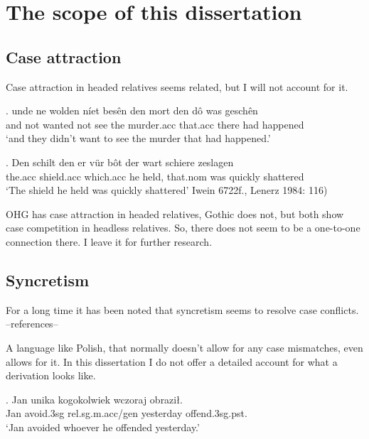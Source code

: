 \section{The scope of this dissertation}

\subsection{Case attraction}\label{sec:attraction}

Case attraction in headed relatives seems related, but I will not account for it.

\exg. unde ne wolden níet besên den mort den dô was geschên\\
 and not wanted not see the murder.\ac{acc} that.\ac{acc} there had happened\\
 `and they didn't want to see the murder that had happened.' 

 \exg. Den schilt den er {vür bôt} der wart schiere zeslagen\\
 the.\ac{acc} shield.\ac{acc} which.\ac{acc} he held, that.\ac{nom} was quickly shattered\\
 `The shield he held was quickly shattered' \label{ex:iaheaded}\hfill Iwein 6722f., Lenerz 1984: 116)

OHG has case attraction in headed relatives, Gothic does not, but both show case competition in headless relatives. So, there does not seem to be a one-to-one connection there. I leave it for further research.

\subsection{Syncretism}

For a long time it has been noted that syncretism seems to resolve case conflicts. --references--

A language like Polish, that normally doesn't allow for any case mismatches, even allows for it. In this dissertation I do not offer a detailed account for what a derivation looks like.

\exg. Jan unika kogokolwiek wczoraj obraził.\\
Jan avoid.3\ac{sg}\scsub{[gen]} \ac{rel}.\ac{sg}.\ac{m}.\ac{acc}/\ac{gen} yesterday offend.3\ac{sg}.\ac{pst}\scsub{[acc]}.\\
`Jan avoided whoever he offended yesterday.'

